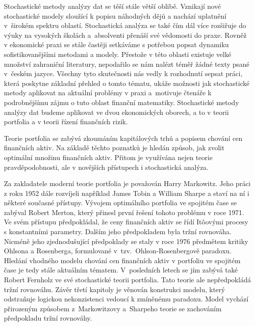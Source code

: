 \documentclass[a4paper,12pt]{report}
\theoremstyle{definition} \newtheorem{definice}[veta]{Definice}
\theoremstyle{remark}
\begin{document}

Stochastické metody analýzy dat se těší stále větší oblibě.
Vznikají nové stochastické modely sloužící k popisu náhodných dějů a nachází uplatnění v~širokém spektru oblastí.
Stochastická analýza se také čím dál více rozšiřuje do výuky na vysokých školách a~absolventi přenáší své vědomosti do praxe.
Rovněž v ekonomické praxi se stále častěji setkáváme s potřebou popsat dynamiku sofistikovanějšími metodami a modely.
Přestože v této oblasti existuje velké množství zahraniční literatury, nepodařilo se nám nalézt téměř žádné texty psané v~českém jazyce.
Všechny tyto skutečnosti nás vedly k rozhodnutí sepsat práci, která poskytne základní přehled o tomto tématu, ukáže možnosti jak stochastické metody aplikovat na aktuální problémy v praxi a~motivuje čtenáře k podrobnějšímu zájmu o tuto oblast finanční matematiky.
Stochastické metody analýzy dat budeme aplikovat ve dvou ekonomických oborech, a to v teorii portfolia a v teorii řízení finančních rizik. 

Teorie portfolia se zabývá zkoumáním kapitálových trhů a popisem chování cen finančních aktiv.
Na základě těchto poznatků je hledán způsob, jak zvolit optimální množinu finančních aktiv.
Přitom je využívána nejen teorie pravděpodobnosti, ale v novějších přístupech i stochastická analýza.

Za zakladatele moderní teorie portfolia je považován Harry Markowitz. 
Jeho práci z roku 1952 dále rozvíjeli například James Tobin a William Sharpe a staví na ní i některé současné přístupy.
%
%
Vývojem optimálního portfolia ve spojitém čase se zabýval Robert Merton, který přinesl první řešení tohoto problému v roce 1971.
Ve svém přístupu předpokládal, že ceny finančních aktiv se řídí It\^oovými procesy s konstantními parametry. 
Dalším jeho předpokladem byla tržní rovnováha.
%
Nicméně jeho zjednodušující předpoklady se staly v roce 1976 předmětem kritiky Ohlsona a Rosenberga, formulované v~tzv.~Ohlson-Rosenbergově paradoxu.
Hledání vhodného modelu chování cen finančních aktiv v portfoliu ve spojitém čase je tedy stále aktuálním tématem. 
V~posledních letech se jím zabývá také Robert Fernholz ve své stochastické teorii portfolia. 
Tato teorie ale nepředpokládá tržní rovnováhu.
Závěr třetí kapitoly je věnován konstrukci modelu, který odstraňuje logickou nekonzistenci vedoucí k zmíněnému paradoxu. 
Model vychází přirozeným způsobem z~Markowitzovy a~Sharpeho teorie se zachováním předpokladu tržní rovnováhy.
\end{document}
